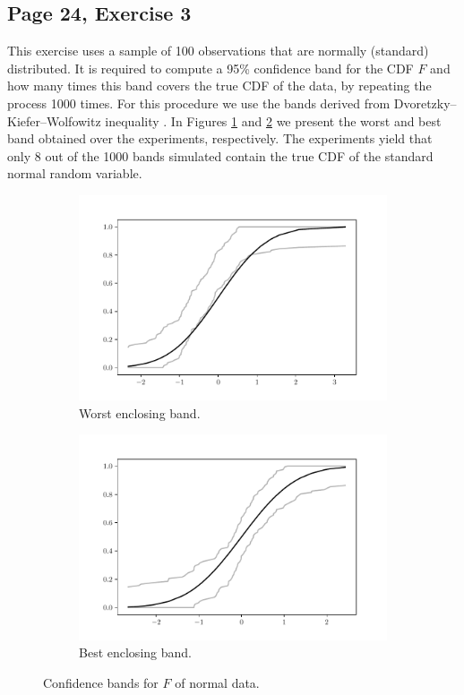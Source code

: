 \documentclass[11pt]{article}
\theoremstyle{definition}
\theoremstyle{remark}
\theoremstyle{remark}
\begin{document}
\subsection*{Page 24, Exercise 3}
This exercise uses a sample of 100 observations that are normally
(standard) distributed. It is required to compute a 95\% confidence
band for the CDF $F$ and how many times this band covers the true CDF
of the data, by repeating the process 1000 times. For this procedure
we use the bands derived from Dvoretzky–Kiefer–Wolfowitz inequality
\cite{wasserman2006}. In Figures \ref{subfig:worst_band_normal} and
\ref{subfig:best_band_normal} we present the worst and best band
obtained over the experiments, respectively. The experiments yield
that only 8 out of the 1000 bands simulated contain the true CDF of
the standard normal random variable.

\begin{figure}[H]
  \centering
  \begin{subfigure}[t]{0.475\textwidth}
      \centering
      \includegraphics[scale=0.45]{../figs/min_normal_bands.pdf}
      \caption{Worst enclosing band.}
      \label{subfig:worst_band_normal}
  \end{subfigure}
  \begin{subfigure}[t]{0.475\textwidth}
      \centering
      \includegraphics[scale=0.45]{../figs/max_normal_bands.pdf}
      \caption{Best enclosing band.}
      \label{subfig:best_band_normal}
  \end{subfigure}
  \caption{Confidence bands for $F$ of normal data.}
  \label{fig:bands_normal}
\end{figure}
\end{document}
